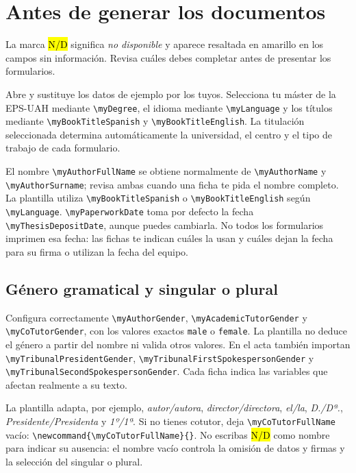 \documentclass[10pt,a4paper]{article}
\newcommand{\variable}[1]{\texttt{\textbackslash{}}\nolinkurl{#1}}
\newcommand{\fichero}[1]{\path{#1}}
\begin{document}
\section{Antes de generar los documentos}

La marca \hl{N/D} significa \emph{no disponible} y aparece resaltada en amarillo en los campos sin información. Revisa cuáles debes completar antes de presentar los formularios.

Abre \fichero{Config/myconfig.tex} y sustituye los datos de ejemplo por los tuyos. Selecciona tu máster de la EPS-UAH mediante \variable{myDegree}, el idioma mediante \variable{myLanguage} y los títulos mediante \variable{myBookTitleSpanish} y \variable{myBookTitleEnglish}. La titulación seleccionada determina automáticamente la universidad, el centro y el tipo de trabajo de cada formulario.

El nombre \variable{myAuthorFullName} se obtiene normalmente de \variable{myAuthorName} y \variable{myAuthorSurname}; revisa ambas cuando una ficha te pida el nombre completo. La plantilla utiliza \variable{myBookTitleSpanish} o \variable{myBookTitleEnglish} según \variable{myLanguage}. \variable{myPaperworkDate} toma por defecto la fecha \variable{myThesisDepositDate}, aunque puedes cambiarla. No todos los formularios imprimen esa fecha: las fichas te indican cuáles la usan y cuáles dejan la fecha para su firma o utilizan la fecha del equipo.

\subsection{Género gramatical y singular o plural}

Configura correctamente \variable{myAuthorGender}, \variable{myAcademicTutorGender} y \variable{myCoTutorGender}, con los valores exactos \texttt{male} o \texttt{female}. La plantilla no deduce el género a partir del nombre ni valida otros valores. En el acta también importan \variable{myTribunalPresidentGender}, \variable{myTribunalFirstSpokespersonGender} y \variable{myTribunalSecondSpokespersonGender}. Cada ficha indica las variables que afectan realmente a su texto.

La plantilla adapta, por ejemplo, \emph{autor/autora}, \emph{director/directora}, \emph{el/la}, \emph{D./Dª.}, \emph{Presidente/Presidenta} y \emph{1º/1ª}. Si no tienes cotutor, deja \variable{myCoTutorFullName} vacío: \verb|\newcommand{\myCoTutorFullName}{}|. No escribas \hl{N/D} como nombre para indicar su ausencia: el nombre vacío controla la omisión de datos y firmas y la selección del singular o plural.
\end{document}
